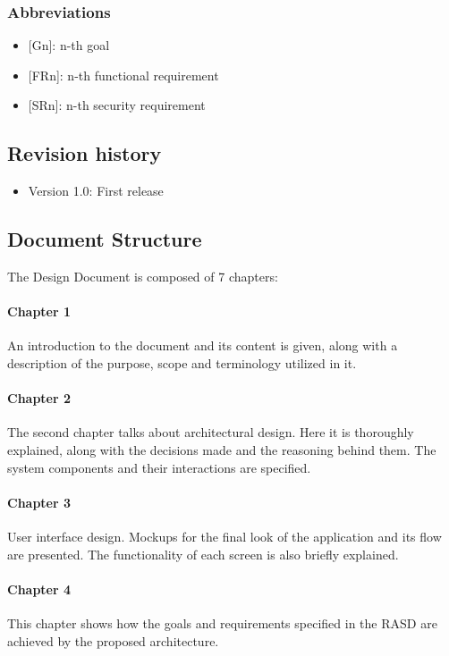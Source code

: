 \subsubsection{Abbreviations}

\begin{itemize}
    \item
    {[Gn]}: n-th goal
    \item
    {[FRn]}: n-th functional requirement
    \item
    {[SRn]}: n-th security requirement
\end{itemize}

\subsection{Revision history}

\begin{itemize}
    \item 
    Version 1.0: First release
\end{itemize}


\subsection{Document Structure}
The Design Document is composed of 7 chapters:

\paragraph{Chapter 1} An introduction to the document and its content is given, along with a description of the purpose, scope and terminology utilized in it.

\paragraph{Chapter 2} The second chapter talks about architectural design. Here it is thoroughly explained, along with the decisions made and the reasoning behind them. The system components and their interactions are specified.

\paragraph{Chapter 3} User interface design. Mockups for the final look of the application and its flow are presented. The functionality of each screen is also briefly explained.

\paragraph{Chapter 4} This chapter shows how the goals and requirements specified in the RASD are achieved by the proposed architecture.

